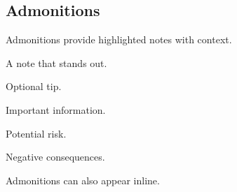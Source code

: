 \documentclass[10pt,titlepage]{article}
\begin{document}

\subsection{Admonitions}

Admonitions provide highlighted notes with context.

\begin{example}
\begin{note}
  A note that stands out.
\end{note}
\end{example}

\begin{example}
\begin{tip}
  Optional tip.
\end{tip}
\end{example}

\begin{example}
\begin{important}
  Important information.
\end{important}
\end{example}

\begin{example}
\begin{caution}
  Potential risk.
\end{caution}
\end{example}

\begin{example}
\begin{danger}
  Negative consequences.
\end{danger}
\end{example}

Admonitions can also appear inline.

\begin{example}
 \\
 \\
 \\
 \\
\end{example}

\end{document}

